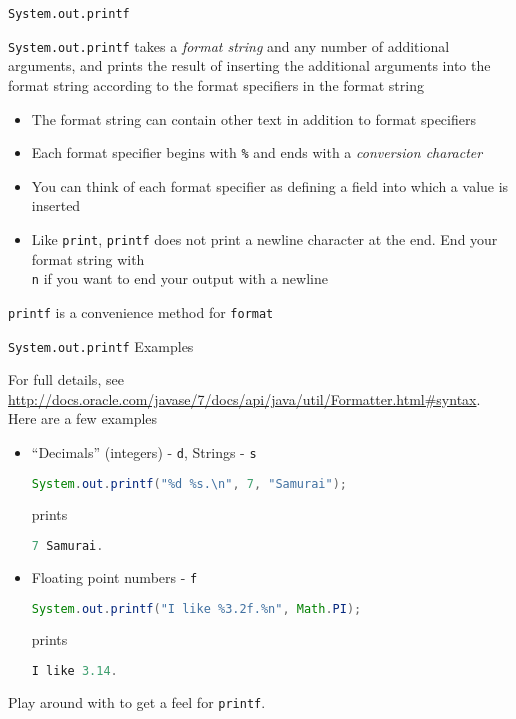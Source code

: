 \documentclass{beamer}
\begin{document}
\begin{frame}[fragile]{{\tt System.out.printf}}


{\tt System.out.printf} takes a {\it format string} and any number of additional arguments, and prints the result of inserting the additional arguments into the format string according to the format specifiers in the format string
\begin{itemize}
\item The format string can contain other text in addition to format specifiers
\item Each format specifier begins with {\tt \%} and ends with a {\it conversion character}
\item You can think of each format specifier as defining a field into which a value is inserted
\item Like {\tt print}, {\tt printf} does not print a newline character at the end.  End your format string with {\tt \\n} if you want to end your output with a newline
\end{itemize}
 {\tt printf} is a convenience method for {\tt format}
\end{frame}

\begin{frame}[fragile]{{\tt System.out.printf} Examples}


For full details, see \url{http://docs.oracle.com/javase/7/docs/api/java/util/Formatter.html#syntax}.  Here are a few examples
\begin{itemize}

\item ``Decimals'' (integers) - {\tt d}, Strings - {\tt s}
\begin{lstlisting}[language=Java]
System.out.printf("%d %s.\n", 7, "Samurai");
\end{lstlisting}
prints
\begin{lstlisting}[language=Java]
7 Samurai.
\end{lstlisting}

\item Floating point numbers - {\tt f}
\begin{lstlisting}[language=Java]
 System.out.printf("I like %3.2f.%n", Math.PI);
\end{lstlisting}
prints
\begin{lstlisting}[language=Java]
I like 3.14.
\end{lstlisting}

\end{itemize}

Play around with  to get a feel for {\tt printf}.

\end{frame}
\end{document}
